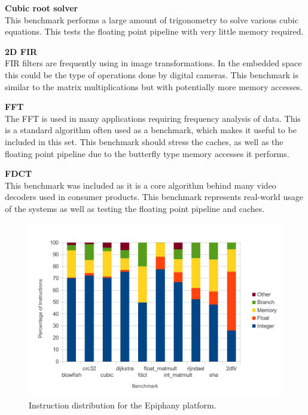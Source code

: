\documentclass[twocolumn]{article}
\begin{document}
\vspace{3mm}
\textbf{Cubic root solver}\\
This benchmark performs a large amount of trigonometry to solve various cubic equations. This tests the floating point pipeline with very little memory required.

\vspace{3mm}
\textbf{2D FIR}\\
FIR filters are frequently using in image transformations. In the embedded space this could be the type of operations done by digital cameras. This benchmark is similar to the matrix multiplications but with potentially more memory accesses.

\vspace{3mm}
\textbf{FFT}\\
The FFT is used in many applications requiring frequency analysis of data. This is a standard algorithm often used as a benchmark, which makes it useful to be included in this set. This benchmark should stress the caches, as well as the floating point pipeline due to the butterfly type memory accesses it performs.

\vspace{3mm}
\textbf{FDCT}\\
This benchmark was included as it is a core algorithm behind many video decoders used in consumer products. This benchmark represents real-world usage of the systems as well as testing the floating point pipeline and caches.

\begin{figure}[t]
	\includegraphics[width=\linewidth]{epiphany.pdf}
	\caption{Instruction distribution for the Epiphany platform.}
	\label{Fig:InstructionDistributionEpiphany}
\end{figure}
\end{document}
